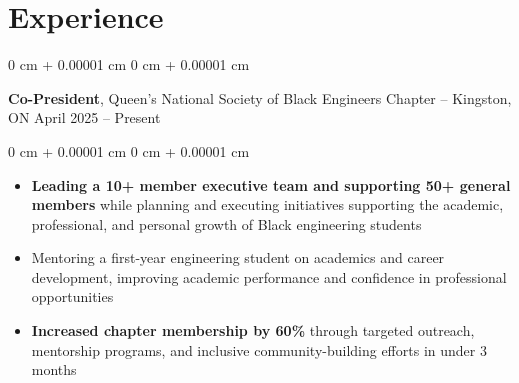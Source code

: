 \documentclass[10pt, letterpaper]{article}
\newenvironment{highlights}{
    \begin{itemize}[
        topsep=0.10 cm,
        parsep=0.10 cm,
        partopsep=0pt,
        itemsep=0pt,
        leftmargin=0 cm + 10pt
    ]
}{
    \end{itemize}
} %
\newenvironment{onecolentry}{
    \begin{adjustwidth}{
        0 cm + 0.00001 cm
    }{
        0 cm + 0.00001 cm
    }
}{
    \end{adjustwidth}
} %
\newenvironment{twocolentry}[2][]{
    \onecolentry
    \def\secondColumn{#2}
    \setcolumnwidth{\fill, 4.5 cm}
    \begin{paracol}{2}
}{
    \switchcolumn \raggedleft \secondColumn
    \end{paracol}
    \endonecolentry
} %
\begin{document}
    \vspace{0.05 cm}
    
    
    
    \section{Experience}

        \begin{twocolentry}{
            April 2025 – Present
        }
            \textbf{Co-President}, Queen's National Society of Black Engineers Chapter -- Kingston, ON\end{twocolentry}

        \vspace{0.10 cm}
        \begin{onecolentry}
            \begin{highlights}
                \item \textbf{Leading a 10+ member executive team and supporting 50+ general members} while planning and executing initiatives supporting the academic, professional, and personal growth of Black engineering students
                \item Mentoring a first-year engineering student on academics and career development, improving academic performance and confidence in professional opportunities
                \item \textbf{Increased chapter membership by 60\%} through targeted outreach, mentorship programs, and inclusive community-building efforts in under 3 months
            \end{highlights}
        \end{onecolentry}

        \vspace{0.2 cm}
        
\end{document}
